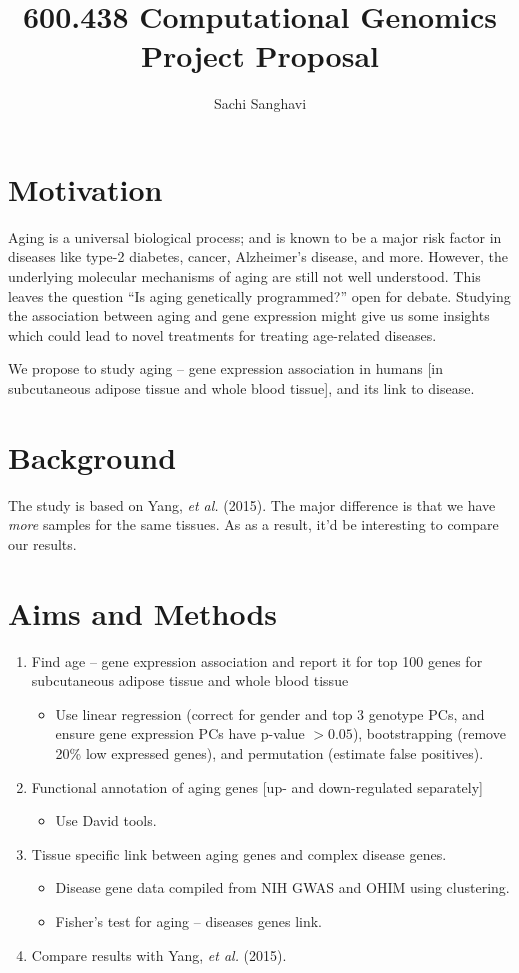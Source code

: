 \documentclass[11pt, oneside]{article}   	%
\title{600.438 Computational Genomics \\ Project Proposal}
\author{Sachi Sanghavi}
\begin{document}
\maketitle

\section{Motivation}

Aging is a universal biological process; and is known to be a major risk factor in diseases like type-2 diabetes, cancer, Alzheimer's disease, and more. However, the underlying molecular mechanisms of aging are still not well understood. This leaves the question ``Is aging genetically programmed?'' open for debate. Studying the association between aging and gene expression might give us some insights which could lead to novel treatments for treating age-related diseases.

We propose to study aging -- gene expression association in humans [in subcutaneous adipose tissue and whole blood tissue], and its link to disease.

\section{Background}

The study is based on Yang, \emph{et al.} (2015). The major difference is that we have \emph{more} samples for the same tissues. As as a result, it'd be interesting to compare our results.

\section{Aims and Methods}

\begin{enumerate}
\item Find age -- gene expression association and report it for top 100 genes for subcutaneous adipose tissue and whole blood tissue
	\begin{itemize}
	\item Use linear regression (correct for gender and top 3 genotype PCs, and ensure gene expression PCs have p-value $>0.05$), bootstrapping (remove 20\% low expressed genes), and permutation (estimate false positives).
	\end{itemize}
\item Functional annotation of aging genes [up- and down-regulated separately]
	\begin{itemize}
	\item Use David tools.
	\end{itemize}
\item Tissue specific link between aging genes and complex disease genes.
	\begin{itemize}
	\item Disease gene data compiled from NIH GWAS and OHIM using clustering.
	\item Fisher's test for aging -- diseases genes link.
	\end{itemize}
\item Compare results with Yang, \emph{et al.} (2015).
\end{enumerate}
\end{document}
